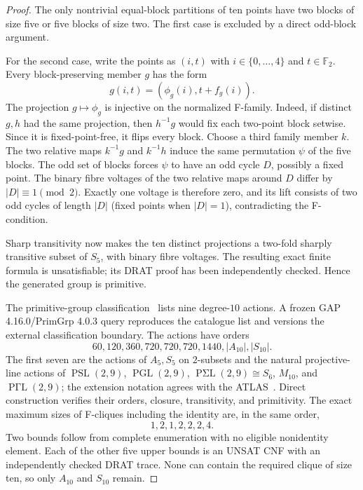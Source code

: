 \begin{proof}
The only nontrivial equal-block partitions of ten points have two blocks of
size five or five blocks of size two.  The first case is excluded by a direct
odd-block argument.

For the second case, write the points as $(i,t)$ with $i\in\{0,\ldots,4\}$
and $t\in\mathbb F_2$.  Every block-preserving member $g$ has the form
\[
 g(i,t)=(\phi_g(i),t+f_g(i)).
\]
The projection $g\mapsto\phi_g$ is injective on the normalized F-family.
Indeed, if distinct $g,h$ had the same projection, then $h^{-1}g$ would fix
each two-point block setwise.  Since it is fixed-point-free, it flips every
block.  Choose a third family member $k$.  The two relative maps
$k^{-1}g$ and $k^{-1}h$ induce the same permutation $\psi$ of the five
blocks.  The odd set of blocks forces $\psi$ to have an odd cycle $D$,
possibly a fixed point.  The binary fibre voltages of the two relative maps
around $D$ differ by $|D|\equiv1\pmod2$.  Exactly one voltage is therefore
zero, and its lift consists of two odd cycles of length $|D|$ (fixed points
when $|D|=1$), contradicting the F-condition.

Sharp transitivity now makes the ten distinct projections a two-fold sharply
transitive subset of $S_5$, with binary fibre voltages.  The resulting exact
finite formula is unsatisfiable; its DRAT proof has been independently
checked.  Hence the generated group is primitive.

The primitive-group classification~\cite{BuekenhoutLeemans1996,GAPPrimGrp}
lists nine degree-$10$ actions.  A frozen GAP 4.16.0/PrimGrp 4.0.3 query
reproduces the catalogue list and versions the external classification
boundary.  The actions have orders
\[
  60,120,360,720,720,720,1440,|A_{10}|,|S_{10}|.
\]
The first seven are the actions of $A_5,S_5$ on $2$-subsets and the natural
projective-line actions of
$\operatorname{PSL}(2,9)$, $\operatorname{PGL}(2,9)$,
$\operatorname{P\Sigma L}(2,9)\cong S_6$, $M_{10}$, and
$\operatorname{P\Gamma L}(2,9)$; the extension notation agrees with the
ATLAS~\cite{AtlasA6}.  Direct construction verifies their orders, closure,
transitivity, and primitivity.  The exact maximum sizes of F-cliques including
the identity are, in the same order,
\[
  1,2,1,2,2,2,4.
\]
Two bounds follow from complete enumeration with no eligible nonidentity
element.  Each of the other five upper bounds is an UNSAT CNF with an
independently checked DRAT trace.  None can contain the required clique of
size ten, so only $A_{10}$ and $S_{10}$ remain.
\end{proof}

